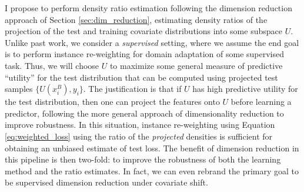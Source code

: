 \documentclass[8pt]{article}
\begin{document}
I propose to perform density ratio estimation following the dimension reduction approach of Section
\ref{sec:dim_reduction}, estimating density ratios of the projection
of the test and training covariate distributions into some subspace
$U$.  Unlike past work, we consider a \emph{supervised} setting, where
we assume the end goal is to perform instance re-weighting for domain
adaptation of some supervised task.  Thus, we will choose $U$ to
maximize some general measure of predictive ``utility'' for the test distribution
that can be computed using projected test samples $\{U(x_i^B),y_i\}$.
The justification is that if $U$ has high predictive utility for the
test distribution, then one can project the features onto $U$ before
learning a predictor, following the more general approach of
dimensionality reduction to improve robustness.  In this situation,
instance re-weighting using Equation \ref{eq:weighted_loss} using the
ratio of the \emph{projected} densities is sufficient for obtaining an
unbiased estimate of test loss.  The benefit of dimension
reduction in this pipeline is then two-fold: to improve the robustness
of both the
learning method and the ratio estimates.  In fact, we can even rebrand
the primary goal to be supervised dimension reduction under covariate shift.


\end{document}
